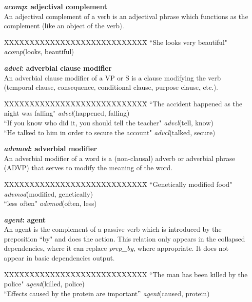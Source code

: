 \documentclass[11pt,letter]{article}
\begin{document}
\bigskip

\noindent\textbf{\emph{acomp}: adjectival complement}\\
An adjectival complement of a verb is an adjectival phrase which functions as the complement (like an object of the verb).
\begin{tabbing}
\hspace{1cm} \=XXXXXXXXXXXXXXXXXXXXXXXXXXXX\= \hspace{1cm}\=  \kill
\> ``She looks very beautiful" \>\> \emph{acomp}(looks, beautiful)\\
\end{tabbing}

\noindent\textbf{\emph{advcl}: adverbial clause modifier}\\
An adverbial clause modifier of a VP or S is a clause modifying the
verb (temporal clause, consequence, conditional clause, purpose
clause, etc.).
\begin{tabbing}
	\hspace{1cm} \=XXXXXXXXXXXXXXXXXXXXXXXXXXXX\= \hspace{1cm}\=  \kill
\> ``The accident happened as the night was falling" \> \> \emph{advcl}(happened, falling)\\
\> ``If you know who did it, you should tell the teacher" \> \> \emph{advcl}(tell, know)\\
\> ``He talked to him in order to secure the account" \>  \> \emph{advcl}(talked, secure)\\
\end{tabbing}

\noindent\textbf{\emph{advmod}: adverbial modifier}\\
An adverbial modifier of a word is a (non-clausal) adverb or adverbial phrase (ADVP) that serves to modify the meaning of the word.
\begin{tabbing}
\hspace{1cm} \=XXXXXXXXXXXXXXXXXXXXXXXXXXXX\= \hspace{1cm}\=  \kill
\>  ``Genetically modified food" \> \> \emph{advmod}(modified, genetically)\\
\> ``less often" \> \> \emph{advmod}(often, less)\\
\end{tabbing}

\noindent\textbf{\emph{agent}: agent}\\
An agent is the complement of a passive verb which is introduced by the preposition ``by" and does the action.
This relation only appears in the collapsed dependencies, where it can
replace \emph{prep\_by}, where appropriate. It does not appear in
basic dependencies output.
\begin{tabbing}
\hspace{1cm} \=XXXXXXXXXXXXXXXXXXXXXXXXXXXX\= \hspace{1cm}\=  \kill
\>  ``The man has been killed by the police" \> \> \emph{agent}(killed, police)\\
\> ``Effects caused by the protein are important'' \> \> \emph{agent}(caused, protein)\\
\end{tabbing}
\end{document}
